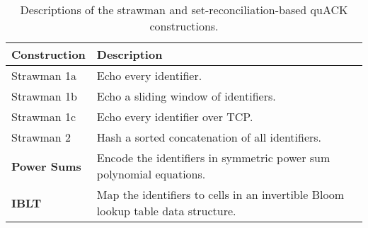 \begin{table}[t]
  \centering
  \begin{tabular}{ll}
    \toprule
    \bf Construction & \bf Description \\
    \midrule
    Strawman 1a & Echo every identifier. \\
    Strawman 1b & Echo a sliding window of identifiers. \\
    Strawman 1c & Echo every identifier over TCP. \\
    Strawman 2 & Hash a sorted concatenation of all identifiers.\\
    \rowcolor{yellow}
    \bf Power Sums & Encode the identifiers in symmetric power sum polynomial equations. \\
    \rowcolor{yellow}
    \bf IBLT & Map the identifiers to cells in an invertible Bloom lookup table data structure. \\
    \bottomrule
  \end{tabular}
  \caption{
  Descriptions of the strawman and set-reconciliation-based quACK constructions.
  }
  \label{tab:quack:constructions}
\end{table}
